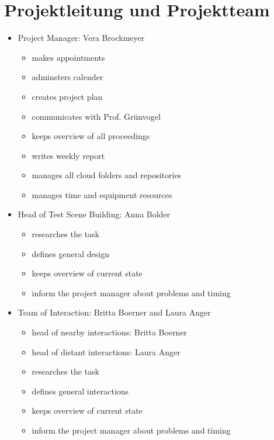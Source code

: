 \documentclass[a4paper, 12pt]{article}
\newcommand{\changefont}[3]{
\fontfamily{#1} \fontseries{#2} \fontshape{#3} \selectfont}
\begin{document}

%


\newpage

\section{Projektleitung und Projektteam}
\begin{itemize}
	\item Project Manager: Vera Brockmeyer
	\begin{itemize}
		\item makes appointments
		\item adminsters calender
		\item creates project plan
		\item communicates with Prof. Grünvogel
		\item keeps overview of all proceedings
		\item writes weekly report
		\item manages all cloud folders and repositories
		\item manages time and equipment resources 
		\end{itemize}
	\item Head of Test Scene Building: Anna Bolder
		\begin{itemize}
		\item researches the task
		\item defines general design
		\item keeps overview of current state
		\item inform the project manager about problems and timing
	\end{itemize} 
	\item Team of Interaction: Britta Boerner and Laura Anger
		\begin{itemize}
		\item head  of nearby interactions: Britta Boerner
		\item head of distant interactions: Laura Anger
		\item researches the task
		\item defines general interactions
		\item keeps overview of current state
		\item inform the project manager about problems and timing
	\end{itemize} 
\end{itemize}
\end{document}
